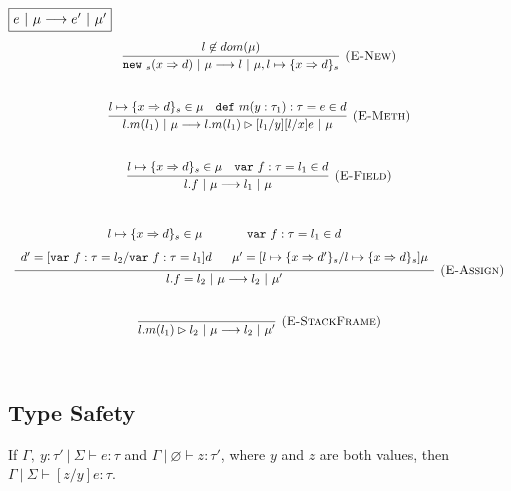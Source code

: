 \documentclass{llncs}
\newcommand{\keywadj}[1]{\mathtt{#1}}
\newcommand{\keyw}[1]{\keywadj{#1}~}
\begin{document}
$\fbox{$e~|~\mu \longrightarrow e'~|~\mu'$}$
\[
\begin{array}{c}
\infer[\textsc{(E-New)}]
  {\keyw{new}_{s}(x \Rightarrow d)~|~\mu \longrightarrow l~|~\mu, l \mapsto \{ x \Rightarrow d \}_{s}}
  {l \not\in dom(\mu)}\\[5ex]
  
\infer[\textsc{(E-Meth)}]
  {l.m(l_1)~|~\mu \longrightarrow l.m(l_1) \rhd [l_1/y][l/x]e~|~\mu}
  {l \mapsto \{ x \Rightarrow d \}_{s} \in \mu & \keyw{def} m(y : \tau_1) : \tau = e \in d}\\[5ex]

\infer[\textsc{(E-Field)}]
  {l.f~|~\mu \longrightarrow l_1~|~\mu}
  {l \mapsto \{ x \Rightarrow d \}_{s} \in \mu & \keyw{var} f:\tau = l_1 \in d}\\[5ex]

\infer[\textsc{(E-Assign)}]
  {l.f = l_2~|~\mu \longrightarrow l_2~|~\mu'}
  {\def\arraystretch{1.6}
  \begin{array}{c}
l \mapsto \{ x \Rightarrow d \}_{s} \in \mu~~~~~~~~~~~\keyw{var} f:\tau = l_1 \in d \\
d' = [\keyw{var} f:\tau = l_2/\keyw{var} f:\tau = l_1]d~~~~~\mu' = [l \mapsto \{ x \Rightarrow d' \}_{s}/l \mapsto \{ x \Rightarrow d \}_{s}]\mu
  \end{array}}\\[5ex]


\infer[\textsc{(E-StackFrame)}]
  {l.m(l_1) \rhd l_2~|~\mu \longrightarrow l_2~|~\mu'}
  {}\\[5ex]
  
\end{array}
\]

\newpage

\subsection{Type Safety}

\begin{lemma}
If $\Gamma,~y : \tau'~|~\Sigma \vdash e : \tau$ and $\Gamma~|~\varnothing \vdash z : \tau'$, where $y$ and $z$ are both values, then $\Gamma~|~\Sigma \vdash [z/y]e : \tau$.
\end{lemma}
\end{document}
